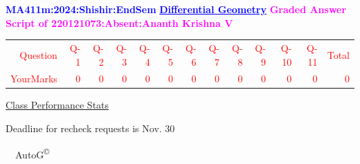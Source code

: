 \documentclass{article}                              %
\begin{document}
%
\vspace*{1in}

\begin{center}
	\textbf{\textcolor{blue}{\LARGE MA411m:2024:Shishir:EndSem}}
	\vskip 1cm
	\textbf{\textcolor{blue}{\underline{\Large Differential Geometry}}}
	\vskip 1cm
	\textbf{\textcolor{magenta}{\LARGE Graded Answer Script of 220121073:Absent:Ananth Krishna V}}
\end{center}


\begin{center}
	\Huge 
	\textcolor{red}{
	\begin{tabular}{*{13}{r}}
		Question&Q-1& Q-2& Q-3& Q-4& Q-5& Q-6& Q-7& Q-8& Q-9& Q-10& Q-11&Total  \\
        	YourMarks&0&0&0&0&0&0&0&0&0&0&0&0
	\end{tabular}
	}
        \vskip 2cm
	\large
	\underline{Class Performance Stats}
	\DTLsetseparator{;}
	\begin{table}[htbp]
		\centering
	\end{table}
	\vskip 1cm
	Deadline for recheck requests is Nov. 30
\end{center}
\ \vfill \ \hfill \small AutoG\textsuperscript{\copyright}
\newpage
%
\end{document}
